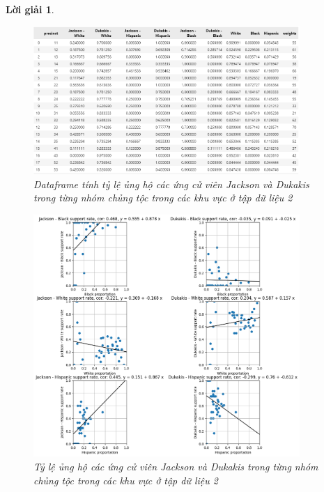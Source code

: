 \documentclass[14pt, a4paper]{article}
\theoremstyle{sltheorem}
\theoremstyle{soltheorem}
\newtheorem*{loigiai}{Lời giải}
\begin{document}
\begin{loigiai}
\begin{enumerate}
    \begin{figure}[H]
        \centering
        \includegraphics[width=0.9\textwidth]{figures/support_rate_df.png}
        \caption{Dataframe tính tỷ lệ ủng hộ các ứng cử viên Jackson và Dukakis trong từng nhóm chủng tộc trong các khu vực ở tập dữ liệu 2}
        \label{fig:Dukakis_candidate_relationship_factor}
    \end{figure}

    \begin{figure}[H]
        \centering
        \includegraphics[width=0.9\textwidth]{figures/race_rate_and_candidate_support_rate.png}
        \caption{Tỷ lệ ủng hộ các ứng cử viên Jackson và Dukakis trong từng nhóm chủng tộc trong các khu vực ở tập dữ liệu 2}
        \label{fig:Dukakis_candidate_relationship_factor}
    \end{figure}


\end{enumerate}
\end{loigiai}
\end{document}
